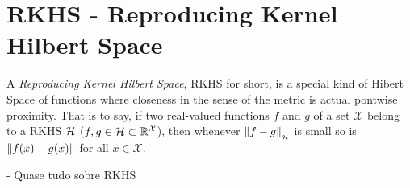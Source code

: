 \section{RKHS - Reproducing Kernel Hilbert Space}

A \textit{Reproducing Kernel Hilbert Space}, RKHS for short, is a special kind
of Hibert Space of functions where closeness in the sense of the metric is
actual pontwise proximity. That is to say, if two real-valued functions $f$ and
$g$ of a set $\mathcal{X}$ belong to a RKHS $\mathcal{H}$ ($f,g \in \mathcal{H} \subset
\mathbb{R}^\mathcal{X}$), then whenever $\left\lVert f-g\right\rVert_{_{\mathcal{H}}}$ is small so is
$\left\lVert f(x)-g(x)\right\rVert$ for all $x \in \mathcal{X}$.


\citet{berlinet2011reproducing} - Quase tudo sobre RKHS